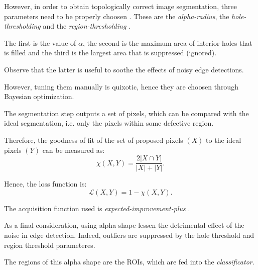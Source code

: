         \par{
            However, in order to obtain topologically correct image segmentation, three parameters need to be properly choosen \cite{springer:10.1007/11907350_46}. These are the \emph{alpha-radius}, the \emph{hole-thresholding} and the \emph{region-thresholding} \cite{matlab:alpha-shape}.
        }
        \par{
            The first is the value of $\alpha$, the second is the maximum area of interior holes that is filled and the third is the largest area that is suppressed (ignored).
        }
        \par{
            Observe that the latter is useful to soothe the effects of noisy edge detections.
        }
        \par{
            However, tuning them manually is quixotic, hence they are choosen through Bayesian optimization.
        }
        \par{
            The segmentation step outputs a set of pixels, which can be compared with the ideal segmentation, i.e. only the pixels within some defective region.
        }
        \par{
            Therefore, the goodness of fit of the set of proposed pixels $\left(X\right)$ to the ideal pixels $\left(Y\right)$ can be measured as:
            \begin{equation*}
                \chi\left(X, Y\right) = \frac{2 \lvert X \cap Y \rvert}{\lvert X \rvert + \lvert Y \rvert}.
            \end{equation*}
        }
        \par{
            Hence, the loss function is:
            \begin{equation*}
                \mathcal{L}\left(X, Y\right) = 1 - \chi\left(X, Y\right).
            \end{equation*}
        }
        \par{
            The acquisition function used is \emph{expected-improvement-plus} \cite{matlab:acquisition}.
        }
        \par{
            As a final consideration, using alpha shape lessen the detrimental effect of the noise in edge detection. Indeed, outliers are suppressed by the hole threshold and region threshold parameteres.
        }
        \par{
            The regions of this alpha shape are the ROIs, which are fed into the \emph{classificator}.
        }
